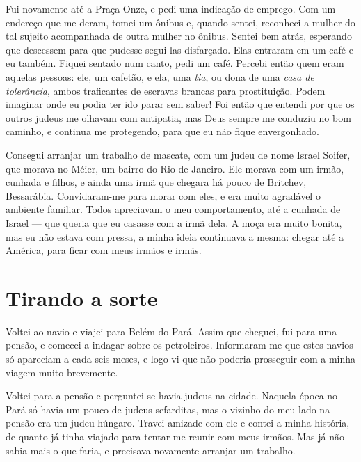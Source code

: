 Fui novamente até a Praça Onze, e pedi uma indicação de
emprego. Com um endereço que me deram, tomei um ônibus e, quando
sentei, reconheci a mulher do tal sujeito acompanhada de outra
mulher no ônibus. Sentei bem atrás, esperando que descessem 
para que pudesse segui-las disfarçado. Elas entraram em um café
e eu também. Fiquei sentado num canto, pedi um café. Percebi então
quem eram aquelas pessoas: ele, um cafetão, e ela, uma \textit{tia}, ou dona de uma \textit{casa de tolerância}, ambos traficantes de escravas
brancas para prostituição. Podem imaginar onde eu podia ter ido parar 
sem saber! Foi então que entendi por que os outros judeus me olhavam com
antipatia, mas Deus sempre me conduziu no bom caminho, e continua me
protegendo, para que eu não fique envergonhado.

Consegui arranjar um trabalho de mascate, com um judeu de nome Israel
Soifer, que morava no Méier, um bairro do Rio de Janeiro. Ele morava
com um irmão, cunhada e filhos, e ainda uma irmã que chegara há pouco
de Britchev, Bessarábia. Convidaram-me para morar com eles, e era muito
agradável o ambiente familiar. Todos apreciavam o meu comportamento,
até a cunhada de Israel --- que queria que eu casasse com a irmã dela. A moça
era muito bonita, mas eu não estava com pressa, a minha ideia continuava
a mesma: chegar até a América, para ficar com meus irmãos e irmãs.

\chapter{Tirando a sorte}


Voltei ao navio e viajei para Belém do Pará. Assim que cheguei, fui para
uma pensão, e comecei a indagar sobre os petroleiros. Informaram-me que estes navios só apareciam a cada seis meses, e logo vi que
não poderia prosseguir com a minha viagem muito brevemente.

Voltei para a pensão e perguntei se havia judeus na cidade. Naquela
época no Pará só havia um pouco de judeus sefarditas, mas o vizinho do meu lado na pensão 
era um judeu húngaro. Travei amizade com ele e
contei a minha história, de quanto já tinha viajado para tentar me
reunir com meus irmãos. Mas já não sabia mais o que faria, e precisava novamente
arranjar um trabalho.

